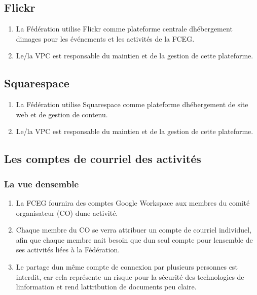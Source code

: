 \subsection{Flickr}
\label{flickr}

\begin{enumerate}
 \item
  La Fédération utilise Flickr comme plateforme centrale d\textquotesingle hébergement d\textquotesingle images pour les événements et les activités de la FCEG.
 \item
  Le/la VPC est responsable du maintien et de la gestion de cette plateforme.
\end{enumerate}

\subsection{Squarespace}
\label{squarespace}

\begin{enumerate}
 \item
  La Fédération utilise Squarespace comme plateforme d\textquotesingle hébergement de site web et de gestion de contenu.
 \item
  Le/la VPC est responsable du maintien et de la gestion de cette plateforme.
\end{enumerate}

\subsection{Les comptes de courriel des activités}
\label{les-comptes-de-courriel-des-activites}

\subsubsection{La vue d\textquotesingle ensemble}
\label{la-vue-densemble-courriel-activites}

\begin{enumerate}
 \item
  La FCEG fournira des comptes Google Workspace aux membres du comité organisateur (CO) d\textquotesingle une activité.
 \item
  Chaque membre du CO se verra attribuer un compte de courriel individuel, afin que chaque membre n\textquotesingle ait besoin que d\textquotesingle un seul compte pour l\textquotesingle ensemble de ses activités liées à la Fédération.
 \item
  Le partage d\textquotesingle un même compte de connexion par plusieurs personnes est interdit, car cela représente un risque pour la sécurité des technologies de l\textquotesingle information et rend l\textquotesingle attribution de documents peu claire.
\end{enumerate}

